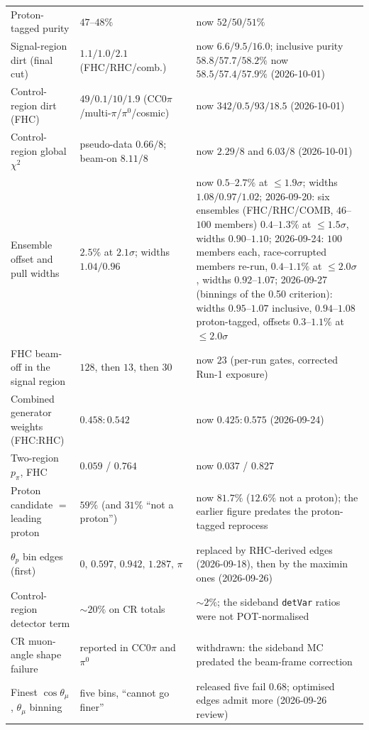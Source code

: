 \begin{center}
\begin{tabular}{p{4.3cm}p{4.2cm}p{6.4cm}}
Proton-tagged purity                & $47$--$48\%$     & now $52/50/51\%$ \\
Signal-region dirt (final cut)      & $1.1/1.0/2.1$ (FHC/RHC/comb.) & now $6.6/9.5/16.0$; inclusive purity $58.8/57.7/58.2\%$ now $58.5/57.4/57.9\%$ (2026-10-01) \\
Control-region dirt (FHC)           & $49/0.1/10/1.9$ (CC$0\pi$/multi-$\pi$/$\pi^0$/cosmic) & now $342/0.5/93/18.5$ (2026-10-01) \\
Control-region global $\chi^2$      & pseudo-data $0.66/8$; beam-on $8.11/8$ & now $2.29/8$ and $6.03/8$ (2026-10-01) \\
Ensemble offset and pull widths     & $2.5\%$ at $2.1\sigma$; widths $1.04/0.96$ & now $0.5$--$2.7\%$ at $\le1.9\sigma$; widths $1.08/0.97/1.02$; 2026-09-20: six ensembles (FHC/RHC/COMB, $46$--$100$ members) $0.4$--$1.3\%$ at $\le1.5\sigma$, widths $0.90$--$1.10$; 2026-09-24: $100$ members each, race-corrupted members re-run, $0.4$--$1.1\%$ at $\le2.0\sigma$, widths $0.92$--$1.07$; 2026-09-27 (binnings of the 0.50 criterion): widths $0.95$--$1.07$ inclusive, $0.94$--$1.08$ proton-tagged, offsets $0.3$--$1.1\%$ at $\le2.0\sigma$ \\
FHC beam-off in the signal region   & $128$, then $13$, then $30$ & now $23$ (per-run gates, corrected Run-1 exposure) \\
Combined generator weights (FHC:RHC) & $0.458{:}0.542$ & now $0.425{:}0.575$ (2026-09-24) \\
Two-region $p_\pi$, FHC            & $0.059$ / $0.764$ & now $0.037$ / $0.827$ \\
Proton candidate $=$ leading proton  & $59\%$ (and $31\%$ ``not a proton'') & now $81.7\%$ ($12.6\%$ not a proton); the earlier figure predates the proton-tagged reprocess \\
$\theta_p$ bin edges (first)        & $0,\,0.597,\,0.942,\,1.287,\,\pi$ & replaced by RHC-derived edges (2026-09-18), then by the maximin ones (2026-09-26) \\
Control-region detector term        & $\sim\!20\%$ on CR totals & $\sim\!2\%$; the sideband \texttt{detVar} ratios were not POT-normalised \\
CR muon-angle shape failure         & reported in CC$0\pi$ and $\pi^0$ & withdrawn: the sideband MC predated the beam-frame correction \\
Finest $\cos\theta_\mu$, $\theta_\mu$ binning & five bins, ``cannot go finer'' & released five fail $0.68$; optimised edges admit more (2026-09-26 review) \\

\end{tabular}
\end{center}
